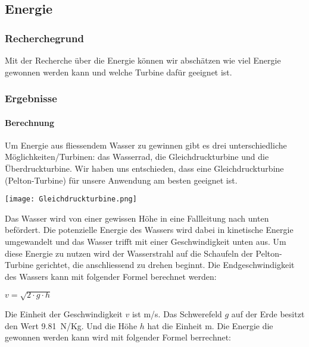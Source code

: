 \subsection{Energie}

\subsubsection{Recherchegrund}

Mit der Recherche über die Energie können wir abschätzen wie viel Energie gewonnen werden kann und welche Turbine dafür geeignet ist.

\subsubsection{Ergebnisse}

\paragraph{Berechnung}

Um Energie aus fliessendem Wasser zu gewinnen gibt es drei unterschiedliche Möglichkeiten/Turbinen: das Wasserrad, die Gleichdruckturbine und die Überdruckturbine. Wir haben uns entschieden, dass eine Gleichdruckturbine (Pelton-Turbine) für unsere Anwendung am besten geeignet ist.

\begin{center}
\texttt{[image: Gleichdruckturbine.png]}
\end{center}

Das Wasser wird von einer gewissen Höhe in eine Fallleitung nach unten befördert. Die potenzielle Energie des Wassers wird dabei in kinetische Energie umgewandelt und das Wasser trifft mit einer Geschwindigkeit unten aus. Um diese Energie zu nutzen wird der Wasserstrahl auf die Schaufeln der Pelton-Turbine gerichtet, die anschliessend zu drehen beginnt.
\newline
\newline 
\newline
Die Endgeschwindigkeit des Wassers kann mit folgender Formel berechnet werden:
\begin{center}
\(v = \sqrt{2 \cdot g \cdot h} \)
\end{center}

Die Einheit der Geschwindigkeit \(v\) ist \si{m/s}. Das Schwerefeld \(g\) auf der Erde besitzt den Wert 9.81~\si{N/Kg}. Und die Höhe \(h\) hat die Einheit \si{m}.
\newline 
\newline 
\newline
Die Energie die gewonnen werden kann wird mit folgender Formel berrechnet:

